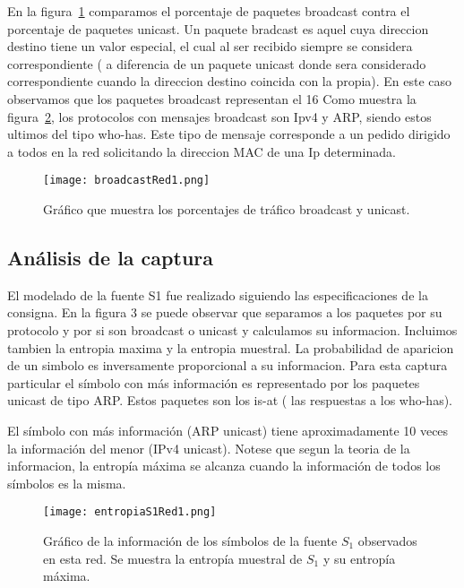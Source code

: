 En la figura~\ref{broadcast1} comparamos el porcentaje de paquetes broadcast contra el porcentaje de paquetes unicast. Un paquete bradcast es aquel cuya direccion destino tiene un valor especial, el cual al ser recibido siempre se considera correspondiente ( a diferencia de un paquete unicast donde sera considerado correspondiente cuando la direccion destino coincida con la propia). En este caso observamos que los paquetes broadcast representan el 16%
Como muestra la figura~\ref{entropias1_1}, los protocolos con mensajes broadcast son Ipv4 y ARP, siendo estos ultimos del tipo who-has. Este tipo de mensaje corresponde a un pedido dirigido a todos en la red solicitando la direccion MAC de una Ip determinada.

\begin{figure}[H]
\centering
\texttt{[image: broadcastRed1.png]}
\caption{Gráfico que muestra los porcentajes de tráfico broadcast y unicast.}
\label{broadcast1}
\end{figure}

\subsection{Análisis de la captura}

El modelado de la fuente S1 fue realizado siguiendo las especificaciones de la consigna.
En la figura 3 se puede observar que separamos a los paquetes por su protocolo y por si son broadcast o unicast y calculamos su informacion. Incluimos tambien la entropia maxima y la entropia muestral.
La probabilidad de aparicion de un simbolo es inversamente proporcional a su informacion.
Para esta captura particular el símbolo con más información es representado por los paquetes unicast de tipo ARP. Estos paquetes son los is-at ( las respuestas a los who-has). 

El símbolo con más información (ARP unicast) tiene aproximadamente 10
veces la información del menor (IPv4 unicast). Notese que  segun la teoria de la informacion, la entropía máxima se alcanza cuando la información de todos los símbolos es la misma.

\begin{figure}[H]
\centering
\texttt{[image: entropiaS1Red1.png]}
\caption{Gráfico de la información de los símbolos de la fuente $S_1$ observados en esta red. Se muestra la entropía muestral de $S_1$ y su entropía máxima.}
\label{entropias1_1}
\end{figure}

